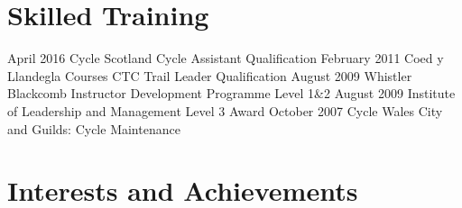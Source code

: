 \documentclass{moderncv}
\begin{document}
\section{Skilled Training}
	\cventry
		{}
		{April 2016}
		{Cycle Scotland}
		{Cycle Assistant Qualification}
		{}
		{}
	\cventry
		{}
		{February 2011}
		{Coed y Llandegla Courses}
		{CTC Trail Leader Qualification}
		{}
		{}
	\cventry
		{}
		{August 2009}
		{Whistler Blackcomb}
		{Instructor Development Programme Level 1\&2}
		{}
		{}
	\cventry
		{}
		{August 2009}
		{Institute of Leadership and Management}
		{Level 3 Award}
		{}
		{}
	\cventry
		{}
		{October 2007}
		{Cycle Wales}
		{City and Guilds: Cycle Maintenance}
		{}
		{}
\section{Interests and Achievements}
\end{document}
